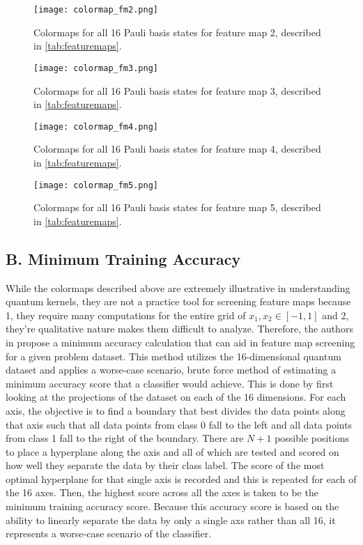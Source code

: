 \documentclass[
	a4paper, %
	10pt, %
	unnumberedsections, %
	twoside, %
]{LTJournalArticle}
\begin{document}
\begin{figure}
	\texttt{[image: colormap\_fm2.png]}
	\caption{Colormaps for all 16 Pauli basis states for feature map 2, described in \ref{tab:featuremaps}.}
	\label{fig:heatmap2}
\end{figure}

\begin{figure}
	\texttt{[image: colormap\_fm3.png]}
	\caption{Colormaps for all 16 Pauli basis states for feature map 3, described in \ref{tab:featuremaps}.}
	\label{fig:heatmap3}
\end{figure}

\begin{figure}
	\texttt{[image: colormap\_fm4.png]}
	\caption{Colormaps for all 16 Pauli basis states for feature map 4, described in \ref{tab:featuremaps}.}
	\label{fig:heatmap4}
\end{figure}

\begin{figure}
	\texttt{[image: colormap\_fm5.png]}
	\caption{Colormaps for all 16 Pauli basis states for feature map 5, described in \ref{tab:featuremaps}.}
	\label{fig:heatmap5}
\end{figure}

\subsection{B. Minimum Training Accuracy}
While the colormaps described above are extremely illustrative in understanding quantum kernels, they are not a practice tool for screening feature maps because 1, they require many 
computations for the entire grid of $x_1, x_2 \in [-1, 1]$ and 2, they're qualitative nature makes them difficult to analyze. Therefore, the authors in \autocite{suzuki2020analysis} propose 
a minimum accuracy calculation that can aid in feature map screening for a given problem dataset. This method utilizes the 16-dimensional quantum dataset and applies a worse-case scenario, 
brute force method of estimating a minimum accuracy score that a classifier would achieve. This is done by first looking at the projections of the dataset on each of the 16 dimensions. For 
each axis, the objective is to find a boundary that best divides the data points along that axis such that all data points from class 0 fall to the left and all data points from class 1 fall 
to the right of the boundary. There are $N+1$ possible positions to place a hyperplane along the axis and all of which are tested and scored on how well they separate the data by their class 
label. The score of the most optimal hyperplane for that single axis is recorded and this is repeated for each of the 16 axes. Then, the highest score across all the axes is taken to be the 
minimum training accuracy score. Because this accuracy score is based on the ability to linearly separate the data by only a single axs rather than all 16, it represents a worse-case scenario 
of the classifier.
\end{document}
